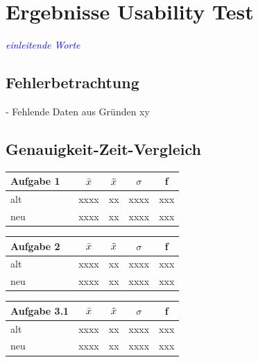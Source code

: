 \section{Ergebnisse Usability Test}
\textcolor{blue}{\textit{einleitende Worte}}\\

\subsection{Fehlerbetrachtung}
- Fehlende Daten aus Gründen xy

\subsection{Genauigkeit-Zeit-Vergleich}
\begin{table}[H]
\begin{tabular}{|l|c|c|c|c|}
\hline
Aufgabe 1\textcolor{white}{.0}   & $\Bar{x}$ & $\Tilde{x}$ & $\sigma$ & f \\ \hline
alt         & xxxx      &  xx         &  xxxx &  xxx   \\ \hline
neu         & xxxx      &  xx         &  xxxx &  xxx   \\ \hline
\end{tabular}
\begin{tabular}{|l|c|c|c|c|}
\hline
Aufgabe 2\textcolor{white}{.0}   & $\Bar{x}$ & $\Tilde{x}$ & $\sigma$ & f \\ \hline
alt         & xxxx      &  xx         &  xxxx &  xxx   \\ \hline
neu         & xxxx      &  xx         &  xxxx &  xxx   \\ \hline
\end{tabular}
\begin{tabular}{|l|c|c|c|c|}
\hline
Aufgabe 3.1   & $\Bar{x}$ & $\Tilde{x}$ & $\sigma$ & f \\ \hline
alt         & xxxx      &  xx         &  xxxx &  xxx   \\ \hline
neu         & xxxx      &  xx         &  xxxx &  xxx   \\ \hline
\end{tabular}
\begin{tabular}{|l|c|c|c|c|}

\end{tabular}
\end{table}
